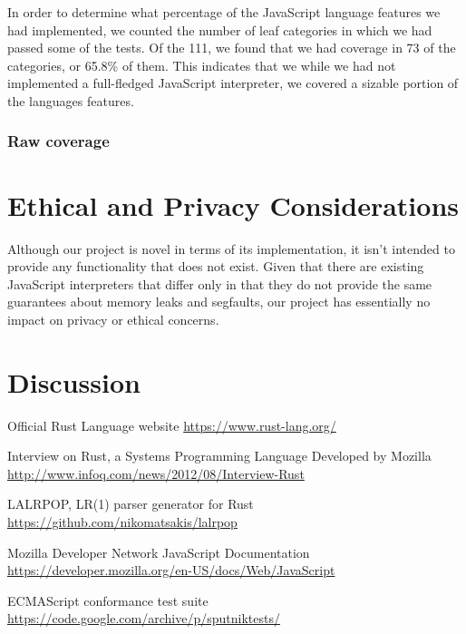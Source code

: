 \documentclass{article}
\begin{document}
In order to determine what percentage of the JavaScript language features we had
implemented, we counted the number of leaf categories in which we had passed
some of the tests. Of the 111, we found that we had coverage in 73 of the
categories, or 65.8\% of them. This indicates that we while we had not
implemented a full-fledged JavaScript interpreter, we covered a sizable portion
of the languages features.

\subsubsection*{Raw coverage}

\section*{Ethical and Privacy Considerations}

Although our project is novel in terms of its implementation, it isn't intended
to provide any functionality that does not exist. Given that there are existing
JavaScript interpreters that differ only in that they do not provide the same
guarantees about memory leaks and segfaults, our project has essentially no
impact on privacy or ethical concerns.

\section*{Discussion}

\pagebreak

\begin{thebibliography}{9}
  Official Rust Language website
  \href{https://www.rust-lang.org/}{https://www.rust-lang.org/}

  Interview on Rust, a Systems Programming Language Developed by Mozilla
  \href{http://www.infoq.com/news/2012/08/Interview-Rust}{http://www.infoq.com/news/2012/08/Interview-Rust}

  LALRPOP, LR(1) parser generator for Rust
  \href{https://github.com/nikomatsakis/lalrpop}{https://github.com/nikomatsakis/lalrpop}

  Mozilla Developer Network JavaScript Documentation
  \href{https://developer.mozilla.org/en-US/docs/Web/JavaScript}{https://developer.mozilla.org/en-US/docs/Web/JavaScript}

  ECMAScript conformance test suite
  \href{https://code.google.com/archive/p/sputniktests/}{https://code.google.com/archive/p/sputniktests/}
\end{thebibliography}
\end{document}
